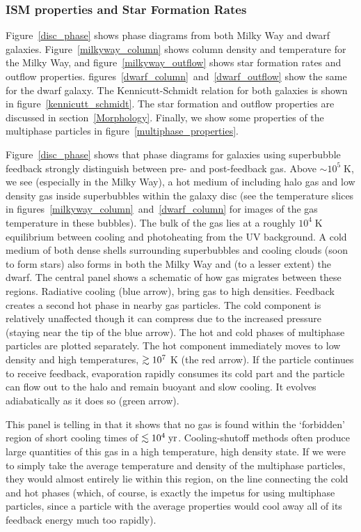 \subsubsection{ISM properties and Star Formation Rates}\label{ISM}

Figure~\ref{disc_phase} shows phase diagrams from both Milky Way and dwarf
galaxies.  Figure~\ref{milkyway_column} shows column density and temperature for
the Milky Way, and figure~\ref{milkyway_outflow} shows star formation rates and
outflow properties.  figures~\ref{dwarf_column}~and~\ref{dwarf_outflow} show the
same for the dwarf galaxy.  The Kennicutt-Schmidt relation for both galaxies is
shown in figure~\ref{kennicutt_schmidt}.  The star formation and outflow properties are
discussed in section~\ref{Morphology}.  Finally, we show some properties of the
multiphase particles in figure~\ref{multiphase_properties}.

Figure~\ref{disc_phase} shows that phase diagrams for galaxies using superbubble
feedback strongly distinguish between pre- and post-feedback gas.  Above $\sim
10^5\;\mathrm{K}$, we see (especially in the Milky Way), a hot medium of
including halo gas and low density gas inside superbubbles within the galaxy
disc (see the temperature slices in
figures~\ref{milkyway_column}~and~\ref{dwarf_column} for images of the gas
temperature in these bubbles).  The bulk of the gas lies at a roughly $10^4\;
\mathrm{K}$ equilibrium between cooling and photoheating from the UV background.
A cold medium of both dense shells surrounding superbubbles and cooling clouds
(soon to form stars) also forms in both the Milky Way and (to a lesser extent)
the dwarf.  The central panel shows a schematic of how gas migrates between
these regions.  Radiative cooling (blue arrow), bring gas to high densities.
Feedback creates a second hot phase in nearby gas particles.  The cold component
is relatively unaffected though it can compress due to the increased pressure
(staying near the tip of the blue arrow).  The hot and cold phases of multiphase
particles are plotted separately.  The hot component immediately moves to low
density and high temperatures,  $\gta 10^7$ K (the red arrow).  If the particle
continues to receive feedback, evaporation rapidly consumes its cold part and
the particle can flow out to the halo and remain buoyant and slow cooling.  It
evolves adiabatically as it does so (green arrow).

This panel is telling in that it shows that no gas is found within the
`forbidden' region of short cooling times of $\lta 10^4\;\mathrm{yr}$.
Cooling-shutoff methods often produce large quantities of this gas in a high
temperature, high density state.  If we were to simply take the average
temperature and density of the multiphase particles, they would almost entirely
lie within this region, on the line connecting the cold and hot phases (which,
of course, is exactly the impetus for using multiphase particles, since a
particle with the average properties would cool away all of its feedback energy
much too rapidly).

